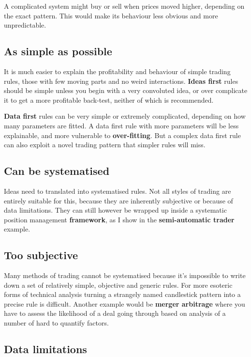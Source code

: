 A complicated system might buy or sell when prices moved higher, depending on the exact pattern. This would make its behaviour less obvious and more unpredictable.

\subsection*{As simple as possible}

It is much easier to explain the profitability and behaviour of simple trading rules, those with few moving parts and no weird interactions. \textbf{Ideas first} rules should be simple unless you begin with a very convoluted idea, or over complicate it to get a more profitable back-test, neither of which is recommended.

\textbf{Data first} rules can be very simple or extremely complicated, depending on how many parameters are fitted. A data first rule with more parameters will be less explainable, and more vulnerable to \textbf{over-fitting}. But a complex data first rule can also exploit a novel trading pattern that simpler rules will miss.

\subsection*{Can be systematised}

Ideas need to translated into systematised rules. Not all styles of trading are entirely suitable for this, because they are inherently subjective or because of data limitations. They can still however be wrapped up inside a systematic position management \textbf{framework}, as I show in the \textbf{semi-automatic trader} example.

\subsection*{Too subjective}

Many methods of trading cannot be systematised because it's impossible to write down a set of relatively simple, objective and generic rules. For more esoteric forms of technical analysis turning a strangely named candlestick pattern into a precise rule is difficult. Another example would be \textbf{merger arbitrage} where you have to assess the likelihood of a deal going through based on analysis of a number of hard to quantify factors.

\subsection*{Data limitations}

